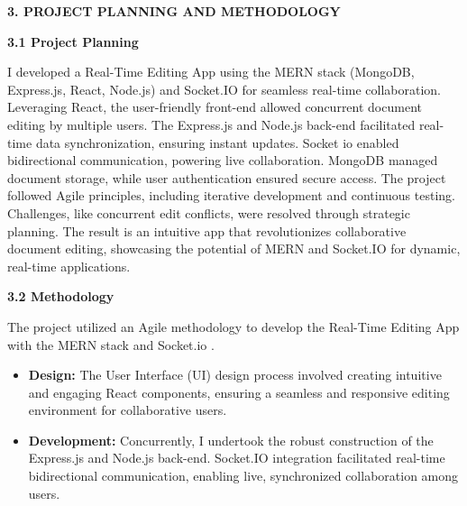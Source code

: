 \documentclass{article}
\begin{document}
\vspace{25pt}



\newpage

\begin{center}
    \LARGE\bfseries 3. PROJECT PLANNING AND METHODOLOGY\\
\end{center}

{\Large\bfseries 3.1 Project Planning \\}

{\normalsize  I developed a Real-Time Editing App using the MERN stack (MongoDB, Express.js, React, Node.js) and Socket.IO for seamless real-time collaboration. Leveraging React, the
 user-friendly front-end allowed concurrent document editing by multiple users. The Express.js
 and Node.js back-end facilitated real-time data synchronization, ensuring instant updates. Socket io enabled bidirectional communication, powering live collaboration. MongoDB managed
 document storage, while user authentication ensured secure access. The project followed 
Agile principles, including iterative development and continuous testing. Challenges, like 
concurrent edit conflicts, were resolved through strategic planning. The result is an intuitive app that
 revolutionizes collaborative document editing, showcasing the potential of MERN and Socket.IO
 for dynamic, real-time applications.}

\vspace{25pt}
{\Large\bfseries 3.2 Methodology \\}

{\normalsize  The project utilized an Agile methodology to develop the Real-Time Editing App
 with the MERN stack and Socket.io . }

\begin{itemize}
    \item {\bfseries Design:} The User Interface (UI) design process involved creating intuitive and engaging React components, ensuring a seamless and responsive editing environment for collaborative users.


    \item {\bfseries Development:}  Concurrently, I undertook the robust construction of the Express.js and Node.js back-end. Socket.IO integration facilitated real-time bidirectional communication, enabling live, synchronized collaboration among users.
    
\end{itemize}
\end{document}
